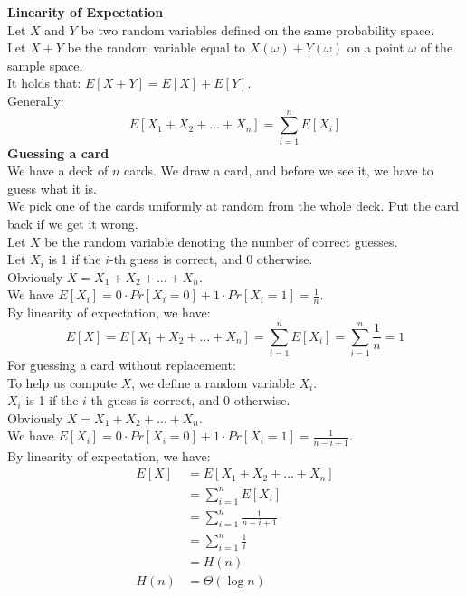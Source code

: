 \documentclass[onecolumn]{report}
\begin{document}
\textbf{Linearity of Expectation}\\
Let $X$ and $Y$ be two random variables defined on the same probability space.\\
Let $X+Y$ be the random variable equal to $X(\omega)+Y(\omega)$ on a point $\omega$ of the sample space.\\
It holds that: $E[X+Y]=E[X]+E[Y]$.\\
Generally:
\begin{equation*}
    E[X_1+X_2+\dots+X_n]=\sum_{i=1}^n E[X_i]
\end{equation*}
\textbf{Guessing a card}\\
We have a deck of $n$ cards. We draw a card, and before we see it, we have to guess what it is.\\
\indent We pick one of the cards uniformly at random from the whole deck. Put the card back if we get it wrong.\\
Let $X$ be the random variable denoting the number of correct guesses.\\
Let $X_i$ is 1 if the $i$-th guess is correct, and 0 otherwise.\\
Obviously $X=X_1+X_2+\dots+X_n$.\\
We have $E[X_i]=0 \cdot Pr[X_i=0]+1 \cdot Pr[X_i=1]=\frac{1}{n}$.\\
By linearity of expectation, we have:
\begin{equation*}
    E[X]=E[X_1+X_2+\dots+X_n]=\sum_{i=1}^n E[X_i]=\sum_{i=1}^n \frac{1}{n}=1
\end{equation*}
For guessing a card without replacement:\\
To help us compute $X$, we define a random variable $X_i$.\\
$X_i$ is 1 if the $i$-th guess is correct, and 0 otherwise.\\
Obviously $X=X_1+X_2+\dots+X_n$.\\
We have $E[X_i]=0 \cdot Pr[X_i=0]+1 \cdot Pr[X_i=1]=\frac{1}{n-i+1}$.\\
By linearity of expectation, we have:
\begin{align*}
    E[X]&=E[X_1+X_2+\dots+X_n]\\
    &=\sum_{i=1}^n E[X_i]\\
    &=\sum_{i=1}^n \frac{1}{n-i+1}\\
    &=\sum_{i=1}^n \frac{1}{i}\\
    &=H(n)\\
    H(n)&=\Theta(\log n)
\end{align*}
\end{document}
